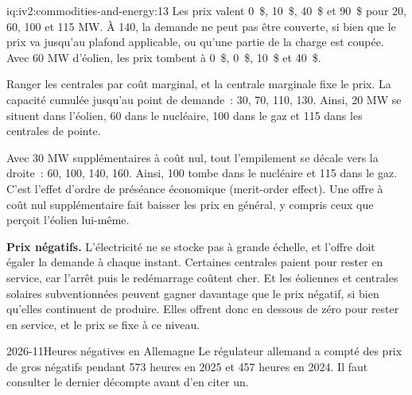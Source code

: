 \begin{solution}{iq:iv2:commodities-and-energy:13}
Les prix valent 0~\$, 10~\$, 40~\$ et 90~\$ pour 20, 60, 100 et 115 MW. À 140, la demande ne peut pas être couverte, si bien que le prix va jusqu'au plafond applicable, ou qu'une partie de la charge est coupée. Avec 60 MW d'éolien, les prix tombent à 0~\$, 0~\$, 10~\$ et 40~\$.

Ranger les centrales par coût marginal, et la centrale marginale fixe le prix. La capacité cumulée jusqu'au point de demande~: 30, 70, 110, 130. Ainsi, 20 MW se situent dans l'éolien, 60 dans le nucléaire, 100 dans le gaz et 115 dans les centrales de pointe.

Avec 30 MW supplémentaires à coût nul, tout l'empilement se décale vers la droite~: 60, 100, 140, 160. Ainsi, 100 tombe dans le nucléaire et 115 dans le gaz. C'est l'effet d'ordre de préséance économique (merit-order effect). Une offre à coût nul supplémentaire fait baisser les prix en général, y compris ceux que perçoit l'éolien lui-même.

\textbf{Prix négatifs.} L'électricité ne se stocke pas à grande échelle, et l'offre doit égaler la demande à chaque instant. Certaines centrales paient pour rester en service, car l'arrêt puis le redémarrage coûtent cher. Et les éoliennes et centrales solaires subventionnées peuvent gagner davantage que le prix négatif, si bien qu'elles continuent de produire. Elles offrent donc en dessous de zéro pour rester en service, et le prix se fixe à ce niveau.

\begin{dated}{2026-11}{Heures négatives en Allemagne}\label{dat:iv2:commodities-and-energy:neg}
Le régulateur allemand a compté des prix de gros négatifs pendant 573 heures en 2025 et 457 heures en 2024. Il faut consulter le dernier décompte avant d'en citer un.
\end{dated}

\end{solution}

